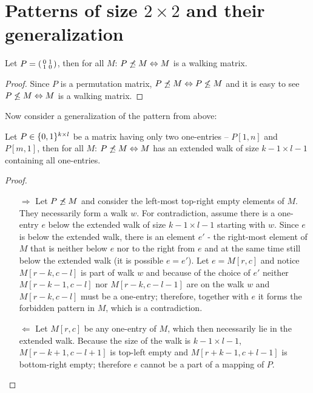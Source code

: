 \section{Patterns of size $2\times2$ and their generalization}
\begin{thm}
\label{walkingthm}
Let $P=\left(\begin{smallmatrix}0&1\\1&0\end{smallmatrix}\right)$, then for all $M$: $P\not\preceq M\Leftrightarrow M$ is a walking matrix.
\end{thm}
\begin{proof}
Since $P$ is a permutation matrix, $P\not\preceq M\Leftrightarrow P\not\leq M$ and it is easy to see $P\not\leq M\Leftrightarrow M$ is a walking matrix.
\end{proof}

Now consider a generalization of the pattern from above:
\begin{thm}
Let $P\in\{0,1\}^{k\times l}$ be a matrix having only two one-entries -- $P[1,n]$ and $P[m,1]$, then for all $M$: $P\not\preceq M\Leftrightarrow M$ has an extended walk of size $k-1\times l-1$ containing all one-entries.
\end{thm}
\begin{proof}
\begin{itemize}
\item[$\Rightarrow$] Let $P\not\preceq M$ and consider the left-most top-right empty elements of $M$. They necessarily form a walk $w$. For contradiction, assume there is a one-entry $e$ below the extended walk of size $k-1\times l-1$ starting with $w$. Since $e$ is below the extended walk, there is an element $e'$ - the right-most element of $M$ that is neither below $e$ nor to the right from $e$ and at the same time still below the extended walk (it is possible $e=e'$). Let $e=M[r,c]$ and notice $M[r-k,c-l]$ is part of walk $w$ and because of the choice of $e'$ neither $M[r-k-1,c-l]$ nor $M[r-k,c-l-1]$ are on the walk $w$ and $M[r-k,c-l]$ must be a one-entry; therefore, together with $e$ it forms the forbidden pattern in $M$, which is a contradiction.
\item[$\Leftarrow$] Let $M[r,c]$ be any one-entry of $M$, which then necessarily lie in the extended walk. Because the size of the walk is $k-1\times l-1$, $M[r-k+1,c-l+1]$ is top-left empty and $M[r+k-1,c+l-1]$ is bottom-right empty; therefore $e$ cannot be a part of a mapping of $P$. 
\end{itemize}
\end{proof}

